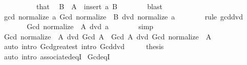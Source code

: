 \begin{isabellebody}
\ \ \isamarkupfalse%
\ {\isacharminus}{\kern0pt}\isanewline
\ \ \ \ \isamarkupfalse%
\ that\ \isamarkupfalse%
\ B\ \ {\isachardoublequoteopen}A\ {\isacharequal}{\kern0pt}\ insert\ a\ B{\isachardoublequoteclose}\isanewline
\ \ \ \ \ \ \isamarkupfalse%
\ blast\isanewline
\ \ \ \ \isamarkupfalse%
\ \isamarkupfalse%
\ {\isachardoublequoteopen}gcd\ {\isacharparenleft}{\kern0pt}normalize\ a{\isacharparenright}{\kern0pt}\ {\isacharparenleft}{\kern0pt}Gcd\ {\isacharparenleft}{\kern0pt}normalize\ {\isacharbackquote}{\kern0pt}\ B{\isacharparenright}{\kern0pt}{\isacharparenright}{\kern0pt}\ dvd\ normalize\ a{\isachardoublequoteclose}\isanewline
\ \ \ \ \ \ \isamarkupfalse%
\ {\isacharparenleft}{\kern0pt}rule\ gcd{\isacharunderscore}{\kern0pt}dvd{}{\isacharparenright}{\kern0pt}\isanewline
\ \ \ \ \isamarkupfalse%
\ \isamarkupfalse%
\ {\isachardoublequoteopen}Gcd\ {\isacharparenleft}{\kern0pt}normalize\ {\isacharbackquote}{\kern0pt}\ A{\isacharparenright}{\kern0pt}\ dvd\ a{\isachardoublequoteclose}\isanewline
\ \ \ \ \ \ \isamarkupfalse%
\ simp\isanewline
\ \ \isamarkupfalse%
\isanewline
\ \ \isamarkupfalse%
\ \isamarkupfalse%
\ {\isachardoublequoteopen}Gcd\ {\isacharparenleft}{\kern0pt}normalize\ {\isacharbackquote}{\kern0pt}\ A{\isacharparenright}{\kern0pt}\ dvd\ Gcd\ A{\isachardoublequoteclose}\ \ {\isachardoublequoteopen}Gcd\ A\ dvd\ Gcd\ {\isacharparenleft}{\kern0pt}normalize\ {\isacharbackquote}{\kern0pt}\ A{\isacharparenright}{\kern0pt}{\isachardoublequoteclose}\isanewline
\ \ \ \ \isamarkupfalse%
\ {\isacharparenleft}{\kern0pt}auto\ intro{\isacharbang}{\kern0pt}{\isacharcolon}{\kern0pt}\ Gcd{\isacharunderscore}{\kern0pt}greatest\ intro{\isacharcolon}{\kern0pt}\ Gcd{\isacharunderscore}{\kern0pt}dvd{\isacharparenright}{\kern0pt}\isanewline
\ \ \isamarkupfalse%
\ \isamarkupfalse%
\ {\isacharquery}{\kern0pt}thesis\isanewline
\ \ \ \ \isamarkupfalse%
\ {\isacharparenleft}{\kern0pt}auto\ intro{\isacharcolon}{\kern0pt}\ associated{\isacharunderscore}{\kern0pt}eqI{\isacharparenright}{\kern0pt}\isanewline
{}\isamarkupfalse%
%
\endisatagproof
{\isafoldproof}%
%
\isadelimproof
\isanewline
%
\endisadelimproof
\isanewline
{}\isamarkupfalse%
\ Gcd{\isacharunderscore}{\kern0pt}eqI{\isacharcolon}{\kern0pt}\isanewline

\end{isabellebody}
